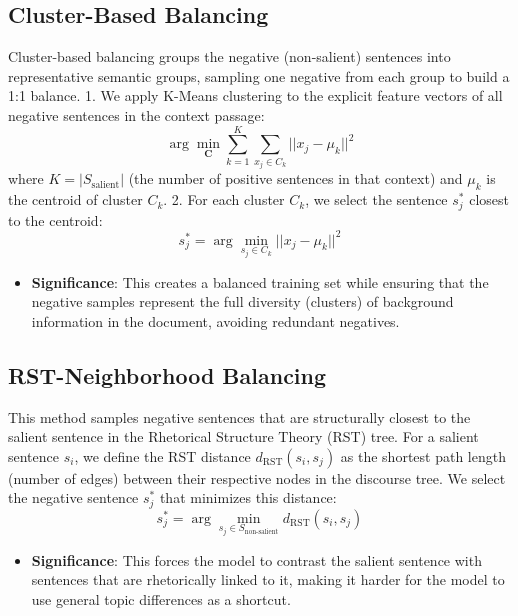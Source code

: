 \documentclass[11pt,a4paper]{article}
\begin{document}
\subsection{Cluster-Based Balancing}
Cluster-based balancing groups the negative (non-salient) sentences into representative semantic groups, sampling one negative from each group to build a 1:1 balance.
1. We apply K-Means clustering to the explicit feature vectors of all negative sentences in the context passage:
\[
\arg\min_{\mathbf{C}} \sum_{k=1}^K \sum_{x_j \in C_k} ||x_j - \mu_k||^2
\]
where $K = |S_{\text{salient}}|$ (the number of positive sentences in that context) and $\mu_k$ is the centroid of cluster $C_k$.
2. For each cluster $C_k$, we select the sentence $s_j^*$ closest to the centroid:
\[
s_j^* = \arg\min_{s_j \in C_k} ||x_j - \mu_k||^2
\]
\begin{itemize}
    \item \textbf{Significance}: This creates a balanced training set while ensuring that the negative samples represent the full diversity (clusters) of background information in the document, avoiding redundant negatives.
\end{itemize}

\subsection{RST-Neighborhood Balancing}
This method samples negative sentences that are structurally closest to the salient sentence in the Rhetorical Structure Theory (RST) tree.
For a salient sentence $s_i$, we define the RST distance $d_{\text{RST}}(s_i, s_j)$ as the shortest path length (number of edges) between their respective nodes in the discourse tree.
We select the negative sentence $s_j^*$ that minimizes this distance:
\[
s_j^* = \arg\min_{s_j \in S_{\text{non-salient}}} d_{\text{RST}}(s_i, s_j)
\]
\begin{itemize}
    \item \textbf{Significance}: This forces the model to contrast the salient sentence with sentences that are rhetorically linked to it, making it harder for the model to use general topic differences as a shortcut.
\end{itemize}
\end{document}

